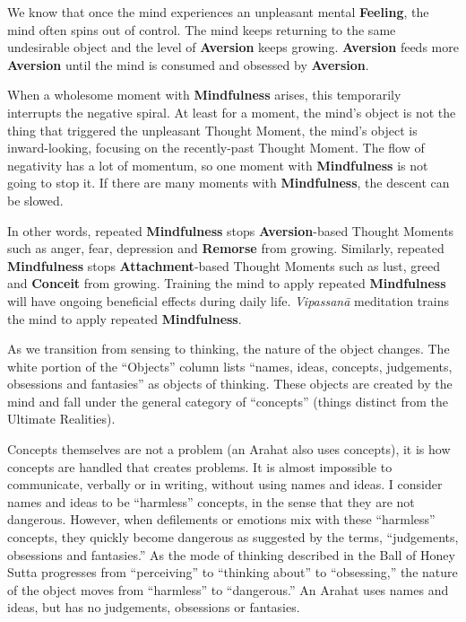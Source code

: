 We know that once the mind experiences an unpleasant mental \textbf{Feeling}, the mind often spins out of control. The mind keeps returning to the same undesirable object and the level of \textbf{Aversion} keeps growing. \textbf{Aversion} feeds more \textbf{Aversion} until the mind is consumed and obsessed by \textbf{Aversion}.

When a wholesome moment with \textbf{Mindfulness} arises, this temporarily interrupts the negative spiral. At least for a moment, the mind’s object is not the thing that triggered the unpleasant Thought Moment, the mind’s object is inward-looking, focusing on the recently-past Thought Moment. The flow of negativity has a lot of momentum, so one moment with \textbf{Mindfulness} is not going to stop it. If there are many moments with \textbf{Mindfulness}, the descent can be slowed.

In other words, repeated \textbf{Mindfulness} stops \textbf{Aversion}-based Thought Moments such as anger, fear, depression and \textbf{Remorse} from growing. Similarly, repeated \textbf{Mindfulness} stops \textbf{Attachment}-based Thought Moments such as lust, greed and \textbf{Conceit} from growing. Training the mind to apply repeated \textbf{Mindfulness} will have ongoing beneficial effects during daily life. \textit{Vipassanā} meditation trains the mind to apply repeated \textbf{Mindfulness}.

As we transition from sensing to thinking, the nature of the object changes. The white portion of the “Objects” column lists “names, ideas, concepts, judgements, obsessions and fantasies” as objects of thinking. These objects are created by the mind and fall under the general category of “concepts” (things distinct from the Ultimate Realities).

Concepts themselves are not a problem (an Arahat also uses concepts), it is how concepts are handled that creates problems. It is almost impossible to communicate, verbally or in writing, without using names and ideas. I consider names and ideas to be “harmless” concepts, in the sense that they are not dangerous. However, when defilements or emotions mix with these “harmless” concepts, they quickly become dangerous as suggested by the terms, “judgements, obsessions and fantasies.” As the mode of thinking described in the Ball of Honey Sutta progresses from “perceiving” to “thinking about” to “obsessing,” the nature of the object moves from “harmless” to “dangerous.” An Arahat uses names and ideas, but has no judgements, obsessions or fantasies.


